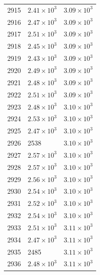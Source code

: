 \begin{table}[H]
\begin{tabular}{lll}
2915 & $\displaystyle 2.41 \times 10^{3}$ & $\displaystyle 3.09 \times 10^{3}$ \\
2916 & $\displaystyle 2.47 \times 10^{3}$ & $\displaystyle 3.09 \times 10^{3}$ \\
2917 & $\displaystyle 2.51 \times 10^{3}$ & $\displaystyle 3.09 \times 10^{3}$ \\
2918 & $\displaystyle 2.45 \times 10^{3}$ & $\displaystyle 3.09 \times 10^{3}$ \\
2919 & $\displaystyle 2.43 \times 10^{3}$ & $\displaystyle 3.09 \times 10^{3}$ \\
2920 & $\displaystyle 2.49 \times 10^{3}$ & $\displaystyle 3.09 \times 10^{3}$ \\
2921 & $\displaystyle 2.48 \times 10^{3}$ & $\displaystyle 3.09 \times 10^{3}$ \\
2922 & $\displaystyle 2.51 \times 10^{3}$ & $\displaystyle 3.09 \times 10^{3}$ \\
2923 & $\displaystyle 2.48 \times 10^{3}$ & $\displaystyle 3.10 \times 10^{3}$ \\
2924 & $\displaystyle 2.53 \times 10^{3}$ & $\displaystyle 3.10 \times 10^{3}$ \\
2925 & $\displaystyle 2.47 \times 10^{3}$ & $\displaystyle 3.10 \times 10^{3}$ \\
2926 & 2538 & $\displaystyle 3.10 \times 10^{3}$ \\
2927 & $\displaystyle 2.57 \times 10^{3}$ & $\displaystyle 3.10 \times 10^{3}$ \\
2928 & $\displaystyle 2.57 \times 10^{3}$ & $\displaystyle 3.10 \times 10^{3}$ \\
2929 & $\displaystyle 2.56 \times 10^{3}$ & $\displaystyle 3.10 \times 10^{3}$ \\
2930 & $\displaystyle 2.54 \times 10^{3}$ & $\displaystyle 3.10 \times 10^{3}$ \\
2931 & $\displaystyle 2.52 \times 10^{3}$ & $\displaystyle 3.10 \times 10^{3}$ \\
2932 & $\displaystyle 2.54 \times 10^{3}$ & $\displaystyle 3.10 \times 10^{3}$ \\
2933 & $\displaystyle 2.51 \times 10^{3}$ & $\displaystyle 3.11 \times 10^{3}$ \\
2934 & $\displaystyle 2.47 \times 10^{3}$ & $\displaystyle 3.11 \times 10^{3}$ \\
2935 & 2485 & $\displaystyle 3.11 \times 10^{3}$ \\
2936 & $\displaystyle 2.48 \times 10^{3}$ & $\displaystyle 3.11 \times 10^{3}$ \\

\end{tabular}
\end{table}
